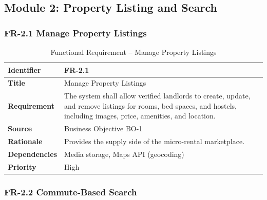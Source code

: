 \subsection{Module 2: Property Listing and Search}

\subsubsection{FR-2.1 Manage Property Listings}

\begin{table}[h]
\centering
\caption{Functional Requirement -- Manage Property Listings}

\begin{tabularx}{\textwidth}{|>{\raggedright\arraybackslash}p{3cm}|X|}
\hline
\textbf{Identifier} & FR-2.1 \\
\hline
\textbf{Title} & Manage Property Listings \\
\hline
\textbf{Requirement} & The system shall allow verified landlords to create, update, and remove listings for rooms, bed spaces, and hostels, including images, price, amenities, and location. \\
\hline
\textbf{Source} & Business Objective BO-1 \\
\hline
\textbf{Rationale} & Provides the supply side of the micro-rental marketplace. \\
\hline
\textbf{Dependencies} & Media storage, Maps API (geocoding) \\
\hline
\textbf{Priority} & High \\
\hline
\end{tabularx}

\end{table}

\subsubsection{FR-2.2 Commute-Based Search}

